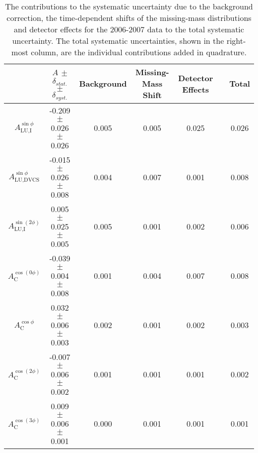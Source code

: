 \begin{table}
 \begin{center}
\resizebox{\textwidth}{!} {
 \begin{tabular}{|c|c|c|c|c|c|c|}
  \hline
 & $A$ $\pm$ $\delta_{stat.}$ $\pm$ $\delta_{syst.}$ & Background & Missing-Mass Shift  & Detector Effects & & Total \\
  \hline
  \hline
  $A_{\textrm{LU,I}}^{\sin\phi}$ & -0.209  $\pm$  0.026  $\pm$   0.026 & 0.005 & 0.005 & 0.025 & & 0.026 \\
  \hline
  $A_{\textrm{LU,DVCS}}^{\sin\phi}$ & -0.015  $\pm$  0.026  $\pm$  0.008 & 0.004 & 0.007 & 0.001 & & 0.008 \\
  \hline
  $A_{\textrm{LU,I}}^{\sin(2\phi)}$ & 0.005  $\pm$  0.025  $\pm$   0.005 & 0.005 & 0.001 & 0.002 & & 0.006 \\
  \hline
  \hline
  $A_{\textrm{C}}^{\cos(0\phi)}$ & -0.039 $\pm$  0.004 $\pm$  0.008 & 0.001 & 0.004 & 0.007 & & 0.008 \\
  \hline
  $A_{\textrm{C}}^{\cos\phi}$ & 0.032  $\pm$  0.006 $\pm$   0.003 & 0.002 & 0.001 & 0.002 & & 0.003 \\
  \hline
  $A_{\textrm{C}}^{\cos(2\phi)}$ & -0.007  $\pm$  0.006  $\pm$   0.002 & 0.001 & 0.001 & 0.001 & & 0.002 \\
  \hline
  $A_{\textrm{C}}^{\cos(3\phi)}$ & 0.009  $\pm$   0.006   $\pm$   0.001 & 0.000 & 0.001 & 0.001 & & 0.001 \\
  \hline
 \end{tabular}
}
  \caption{The contributions to the systematic uncertainty due to the
background correction, the time-dependent shifts of the missing-mass
distributions and detector effects for the 2006-2007 data to the total
systematic uncertainty. The total systematic uncertainties, shown in the
right-most column, are the individual contributions added in quadrature.}
  \label{table_systematic_contributions_0607}
\end{center}
\end{table}

